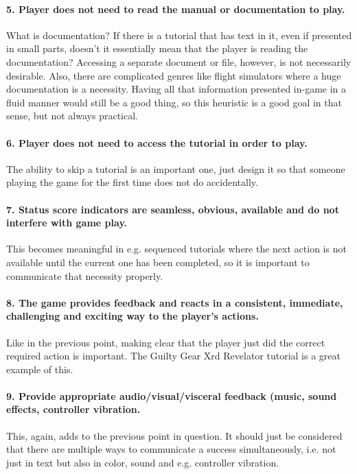 \paragraph{5. Player does not need to read the manual or documentation to play.} What is documentation? If there is a tutorial that has text in it, even if presented in small parts, doesn't it essentially mean that the player is reading the documentation? Accessing a separate document or file, however, is not necessarily desirable. Also, there are complicated genres like flight simulators where a huge documentation is a necessity. Having all that information presented in-game in a fluid manner would still be a good thing, so this heuristic is a good goal in that sense, but not always practical.

\paragraph{6. Player does not need to access the tutorial in order to play.} The ability to skip a tutorial is an important one, just design it so that someone playing the game for the first time does not do accidentally.

\paragraph{7. Status score indicators are seamless, obvious, available and do not interfere with game play.}
This becomes meaningful in e.g. sequenced tutorials where the next action is not available until the current one has been completed, so it is important to communicate that necessity properly.

\paragraph{8. The game provides feedback and reacts in a consistent, immediate, challenging and exciting way to the player's actions.} Like in the previous point, making clear that the player just did the correct required action is important. The Guilty Gear Xrd Revelator tutorial is a great example of this.

\paragraph{9. Provide appropriate audio/visual/visceral feedback (music, sound effects, controller vibration.} This, again, adds to the previous point in question. It should just be considered that there are multiple ways to communicate a success simultaneously, i.e. not just in text but also in color, sound and e.g. controller vibration.

